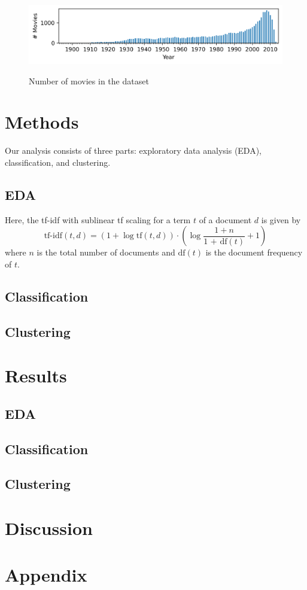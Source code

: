 \documentclass[hidelinks]{article}
\begin{document}
\begin{multicols}{2}
\begin{figure}
\centering
\caption{Number of movies in the dataset}
\includegraphics[width=5.5in]{figures/number_movies_per_year_bar_chart.png}
\label{figure:number_movies_per_year_bar_chart}
\end{figure}

\section{Methods}
Our analysis consists of three parts: exploratory data analysis (EDA), classification, and clustering.
\subsection{EDA}
Here, the tf-idf with sublinear tf scaling for a term $t$ of a document $d$ is given by
$$\text{tf-idf}(t, d) = (1 + \log\text{tf}(t, d)) \cdot \left(\log\frac{1 + n}{\text{1 + df}(t)} + 1\right)$$
where $n$ is the total number of documents and $\text{df}(t)$ is the document frequency of $t$.
\subsection{Classification}
\subsection{Clustering}

\section{Results}
\subsection{EDA}
\subsection{Classification}
\subsection{Clustering}

\section{Discussion}
\end{multicols}

\nocite{10.1145/2723372.2751523}



\section{Appendix}
\end{document}

